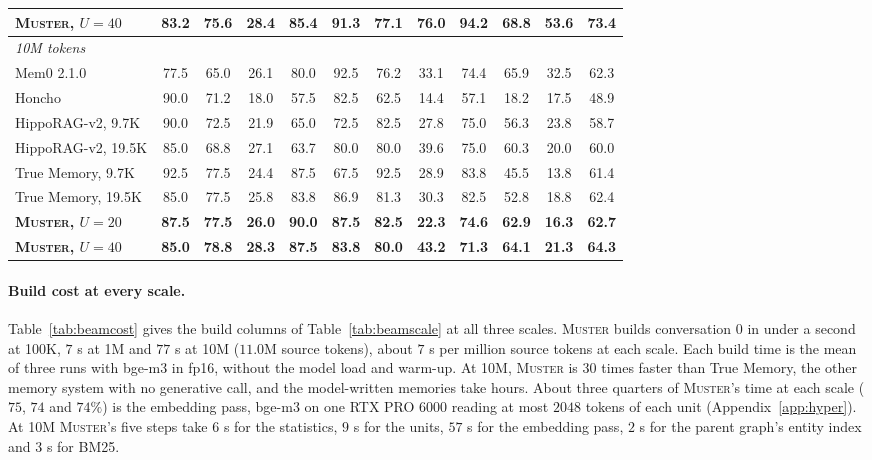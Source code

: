 \documentclass{article}
\newcommand{\ours}{\rowcolor{oursbg}}
\newcommand{\sys}{\textsc{Muster}}
\begin{document}
\begin{table}[H]
\begin{tabular}{lccccccccccc}
\ours \textbf{\sys{}, $U{=}40$} & \textbf{83.2} & \textbf{75.6} & \textbf{28.4} & \textbf{85.4} & \textbf{91.3} & \textbf{77.1} & \textbf{76.0} & \textbf{94.2} & \textbf{68.8} & \textbf{53.6} & \textbf{73.4} \\
\midrule
\multicolumn{12}{l}{\emph{10M tokens}}\\
Mem0 2.1.0 & 77.5 & 65.0 & 26.1 & 80.0 & 92.5 & 76.2 & 33.1 & 74.4 & 65.9 & 32.5 & 62.3 \\
Honcho & 90.0 & 71.2 & 18.0 & 57.5 & 82.5 & 62.5 & 14.4 & 57.1 & 18.2 & 17.5 & 48.9 \\
HippoRAG-v2, 9.7K & 90.0 & 72.5 & 21.9 & 65.0 & 72.5 & 82.5 & 27.8 & 75.0 & 56.3 & 23.8 & 58.7 \\
HippoRAG-v2, 19.5K & 85.0 & 68.8 & 27.1 & 63.7 & 80.0 & 80.0 & 39.6 & 75.0 & 60.3 & 20.0 & 60.0 \\
True Memory, 9.7K & 92.5 & 77.5 & 24.4 & 87.5 & 67.5 & 92.5 & 28.9 & 83.8 & 45.5 & 13.8 & 61.4 \\
True Memory, 19.5K & 85.0 & 77.5 & 25.8 & 83.8 & 86.9 & 81.3 & 30.3 & 82.5 & 52.8 & 18.8 & 62.4 \\
\ours \textbf{\sys{}, $U{=}20$} & \textbf{87.5} & \textbf{77.5} & \textbf{26.0} & \textbf{90.0} & \textbf{87.5} & \textbf{82.5} & \textbf{22.3} & \textbf{74.6} & \textbf{62.9} & \textbf{16.3} & \textbf{62.7} \\
\ours \textbf{\sys{}, $U{=}40$} & \textbf{85.0} & \textbf{78.8} & \textbf{28.3} & \textbf{87.5} & \textbf{83.8} & \textbf{80.0} & \textbf{43.2} & \textbf{71.3} & \textbf{64.1} & \textbf{21.3} & \textbf{64.3} \\
\bottomrule
\end{tabular}
\end{table}

\paragraph{Build cost at every scale.} Table~\ref{tab:beamcost} gives the build columns of Table~\ref{tab:beamscale} at all three scales. \sys{} builds conversation 0 in under a second at 100K, $7$ s at 1M and $77$ s at 10M ($11.0$M source tokens), about $7$ s per million source tokens at each scale. Each build time is the mean of three runs with bge-m3 in fp16, without the model load and warm-up. At 10M, \sys{} is $30$ times faster than True Memory, the other memory system with no generative call, and the model-written memories take hours. About three quarters of \sys{}'s time at each scale ($75$, $74$ and $74\%$) is the embedding pass, bge-m3 on one RTX PRO 6000 reading at most $2048$ tokens of each unit (Appendix~\ref{app:hyper}). At 10M \sys{}'s five steps take $6$ s for the statistics, $9$ s for the units, $57$ s for the embedding pass, $2$ s for the parent graph's entity index and $3$ s for BM25.
\end{document}
